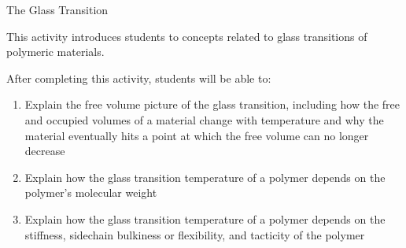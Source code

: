 %
%
%
%

\renewcommand{\figpath}{content/polymphys/thermal-transitions/Tg/figs}
\renewcommand{\labelbase}{Tg}

\begin{activity}{The Glass Transition}

\begin{instructornotes}
	This activity introduces students to concepts related to glass transitions of polymeric materials.
	
	After completing this activity, students will be able to:
	\begin{enumerate}
		\item Explain the free volume picture of the glass transition, including how the free and occupied volumes of a material change with temperature and why the material eventually hits a point at which the free volume can no longer decrease
		\item Explain how the glass transition temperature of a polymer depends on the polymer's molecular weight
		\item Explain how the glass transition temperature of a polymer depends on the stiffness, sidechain bulkiness or flexibility, and tacticity of the polymer
	\end{enumerate}
	

\end{instructornotes}
\end{activity}
